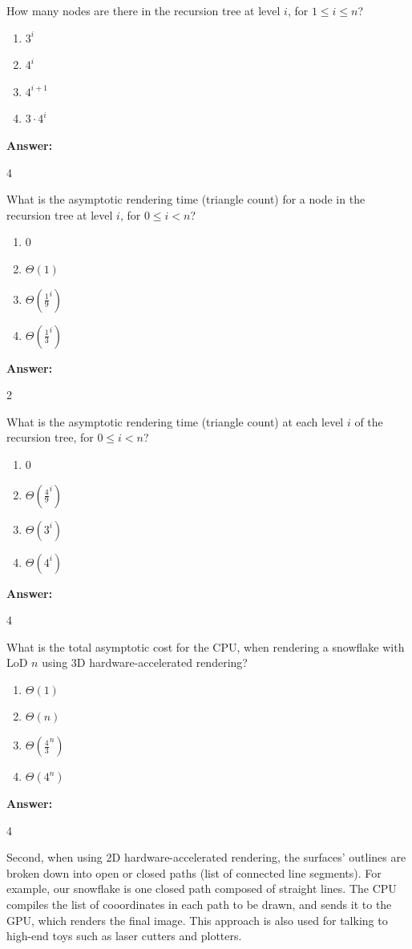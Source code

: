 \documentclass[12pt,twoside]{article}
\newcommand{\answer}{
 \par\medskip
 \textbf{Answer:}
}
\newcommand{\answerIb}{ \answer
4
}
\newcommand{\answerIc}{ \answer
2
}
\newcommand{\answerId}{ \answer
4
}
\newcommand{\answerIe}{ \answer
4
}
\begin{document}
\begin{problems}
\begin{problemparts}
  \problempart {} How many nodes are there in the recursion tree at level
  $i$, for $1 \le i \le n$?
    \begin{enumerate}
     \item $3 ^ i$
      \item $4 ^ i$
      \item $4 ^ {i + 1}$
      \item $3 \cdot 4 ^ i$
    \end{enumerate}
\answerIb
    
  \problempart {} What is the asymptotic rendering time (triangle count) for a
  node in the recursion tree at level $i$, for $0 \le i < n$?
    \begin{enumerate}
      \item $0$
      \item $\Theta(1)$
      \item $\Theta(\frac{1}{9}^i)$
      \item $\Theta(\frac{1}{3}^i)$
    \end{enumerate}
\answerIc 

  \problempart {} What is the asymptotic rendering time (triangle count) at
  each level $i$ of the recursion tree, for $0 \le i < n$?
    \begin{enumerate}
      \item 0
      \item $\Theta(\frac{4}{9} ^ i)$
      \item $\Theta(3 ^ i)$
      \item $\Theta(4 ^ i)$
    \end{enumerate}
\answerId

  \problempart {} What is the total asymptotic cost for the CPU, when rendering
  a snowflake with LoD $n$ using 3D hardware-accelerated rendering?
    \begin{enumerate}
      \item $\Theta(1)$
      \item $\Theta(n)$
      \item $\Theta(\frac{4}{3}^n)$
      \item $\Theta(4^n)$
    \end{enumerate}
\answerIe
\end{problemparts}

Second, when using 2D hardware-accelerated rendering, the surfaces'
outlines are broken down into open or closed paths (list of connected
line segments). For example, our snowflake is one closed path composed of
straight lines. The CPU compiles the list of cooordinates in each path to be
drawn, and sends it to the GPU, which renders the final image. This approach is
also used for talking to high-end toys such as laser cutters and plotters.


\end{problems}
\end{document}
